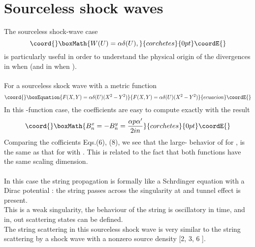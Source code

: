 \documentclass[12pt,a4paper]{article}
\begin{document}
\section{Sourceless shock waves}
The sourceless shock-wave case 
\begin{displaymath}\coord{}\boxMath{
W(U) = \alpha \delta (U),
}{corchetes}{0pt}\coordE{}\end{displaymath}
is particularly useful in order to understand the physical origin of the 
divergences in \coordHE{} when \coordHE{} (and in 
\coordHE{} when \coordHE{}). \\ \\
For a sourceless skock wave with a metric function 
\begin{equation}\coord{}\boxEquation{
F(X,Y) = \alpha \delta (U)(X^2 -Y^2)
}{
F(X,Y) = \alpha \delta (U)(X^2 -Y^2)
}{ecuacion}\coordE{}\end{equation}
In this \myHighlight{$\delta $}\coordHE{}-function case, the \coordHE{} coefficients are easy to compute 
exactly with the result 
\begin{displaymath}\coord{}\boxMath{
B_n^x =- B_n^y = \frac{\alpha p \alpha' }{2in}
}{corchetes}{0pt}\coordE{}\end{displaymath}
Comparing the \coordHE{} cofficients Eqs.(6), (8), we see that the large-\coordHE{} 
behavior of 
\coordHE{} for 
\coordHE{}, is the same as that for \coordHE{} with \coordHE{}. This is related to the fact that both functions \coordHE{} 
have the same scaling dimension. \\ \\
In this case the string propagation is formally like a Schr\coordHE{}dinger equation with a Dirac \myHighlight{$\delta $}\coordHE{} potential : the string passes across the 
singularity at \coordHE{} and tunnel effect is present.\\
This is a weak singularity, the behaviour of the string is oscillatory in 
time, and in, out scattering states can be defined. \\ 
The string 
scattering in this sourceless shock wave is very similar to the string 
scattering by a shock wave with a nonzero source density [2, 3, 6 ].\\ 
\end{document}
